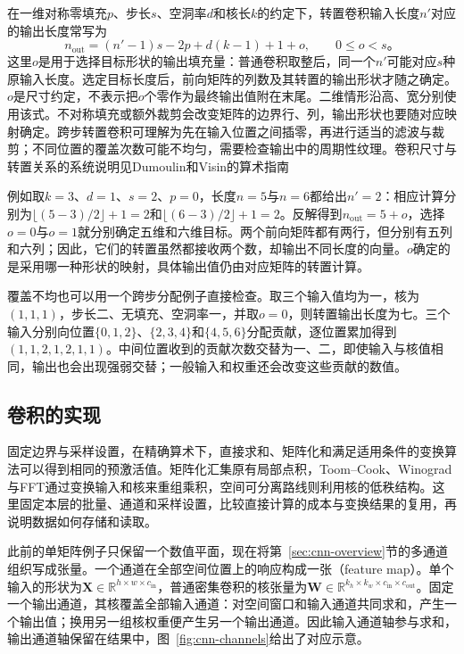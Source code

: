 在一维对称零填充$p$、步长$s$、空洞率$d$和核长$k$的约定下，转置卷积输入长度$n'$对应的输出长度常写为
\begin{equation}
  n_{\mathrm{out}}=(n'-1)s-2p+d(k-1)+1+o,
  \qquad 0\leq o<s\text{。}
  \label{eq:cnn-transposed-size}
\end{equation}
这里$o$是用于选择目标形状的输出填充量：普通卷积取整后，同一个$n'$可能对应$s$种原输入长度。选定目标长度后，前向矩阵的列数及其转置的输出形状才随之确定。$o$是尺寸约定，不表示把$o$个零作为最终输出值附在末尾。二维情形沿高、宽分别使用该式。不对称填充或额外裁剪会改变矩阵的边界行、列，输出形状也要随对应映射确定。跨步转置卷积可理解为先在输入位置之间插零，再进行适当的滤波与裁剪；不同位置的覆盖次数可能不均匀，需要检查输出中的周期性纹理。卷积尺寸与转置关系的系统说明见Dumoulin和Visin的算术指南

例如取$k=3$、$d=1$、$s=2$、$p=0$，长度$n=5$与$n=6$都给出$n'=2$：相应计算分别为$\lfloor(5-3)/2\rfloor+1=2$和$\lfloor(6-3)/2\rfloor+1=2$。反解得到$n_{\mathrm{out}}=5+o$，选择$o=0$与$o=1$就分别确定五维和六维目标。两个前向矩阵都有两行，但分别有五列和六列；因此，它们的转置虽然都接收两个数，却输出不同长度的向量。$o$确定的是采用哪一种形状的映射，具体输出值仍由对应矩阵的转置计算。

覆盖不均也可以用一个跨步分配例子直接检查。取三个输入值均为一，核为$(1,1,1)$，步长二、无填充、空洞率一，并取$o=0$，则转置输出长度为七。三个输入分别向位置$\{0,1,2\}$、$\{2,3,4\}$和$\{4,5,6\}$分配贡献，逐位置累加得到$(1,1,2,1,2,1,1)$。中间位置收到的贡献次数交替为一、二，即使输入与核值相同，输出也会出现强弱交替；一般输入和权重还会改变这些贡献的数值。

\subsection{卷积的实现}
\label{sec:cnn-implementation}

固定边界与采样设置，在精确算术下，直接求和、矩阵化和满足适用条件的变换算法可以得到相同的预激活值。矩阵化汇集原有局部点积，Toom--Cook、Winograd与FFT通过变换输入和核来重组乘积，空间可分离路线则利用核的低秩结构。这里固定本层的批量、通道和采样设置，比较直接计算的成本与变换结果的复用，再说明数据如何存储和读取。

此前的单矩阵例子只保留一个数值平面，现在将第~\ref{sec:cnn-overview}节的多通道组织写成张量。一个通道在全部空间位置上的响应构成一张（feature map）。单个输入的形状为$\bm X\in\mathbb R^{h\times w\times c_{\mathrm{in}}}$，普通密集卷积的核张量为$\bm W\in\mathbb R^{k_h\times k_w\times c_{\mathrm{in}}\times c_{\mathrm{out}}}$。固定一个输出通道，其核覆盖全部输入通道：对空间窗口和输入通道共同求和，产生一个输出值；换用另一组核权重便产生另一个输出通道。因此输入通道轴参与求和，输出通道轴保留在结果中，图~\ref{fig:cnn-channels}给出了对应示意。

